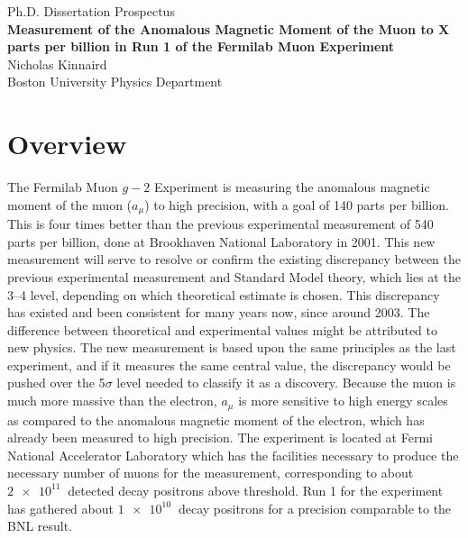 \documentclass[12pt,letterpaper]{article}
\def\gmtwo{$g-2$\xspace}
\def\amu{$a_{\mu}$\xspace}
\begin{document}
\begin{center}
\Large{Ph.D. Dissertation Prospectus} \\\vspace{5mm}
\textbf{\Large{Measurement of the Anomalous Magnetic Moment of the Muon to X parts per billion in Run 1 of the Fermilab Muon  Experiment}} \\\vspace{5mm}
\large{Nicholas Kinnaird} \\\vspace{5mm}
\large{Boston University Physics Department} \\\vspace{5mm}
\end{center}


\section*{Overview}


The Fermilab Muon \gmtwo Experiment is measuring the anomalous magnetic moment of the muon (\amu) to high precision, with a goal of 140 parts per billion. This is four times better than the previous experimental measurement of 540 parts per billion, done at Brookhaven National Laboratory in 2001. This new measurement will serve to resolve or confirm the existing discrepancy between the previous experimental measurement and Standard Model theory, which lies at the \SIrange{3}{4}{\sigma} level, depending on which theoretical estimate is chosen. This discrepancy has existed and been consistent for many years now, since around 2003. The difference between theoretical and experimental values might be attributed to new physics. The new measurement is based upon the same principles as the last experiment, and if it measures the same central value, the discrepancy would be pushed over the 5$\sigma$ level needed to classify it as a discovery. Because the muon is much more massive than the electron, \amu is more sensitive to high energy scales as compared to the anomalous magnetic moment of the electron, which has already been measured to high precision. The experiment is located at Fermi National Accelerator Laboratory which has the facilities necessary to produce the necessary number of muons for the measurement, corresponding to about $\SI{2e11}{}$ detected decay positrons above threshold. Run 1 for the experiment has gathered about $\SI{1e10}{}$ decay positrons for a precision comparable to the BNL result.
\end{document}
